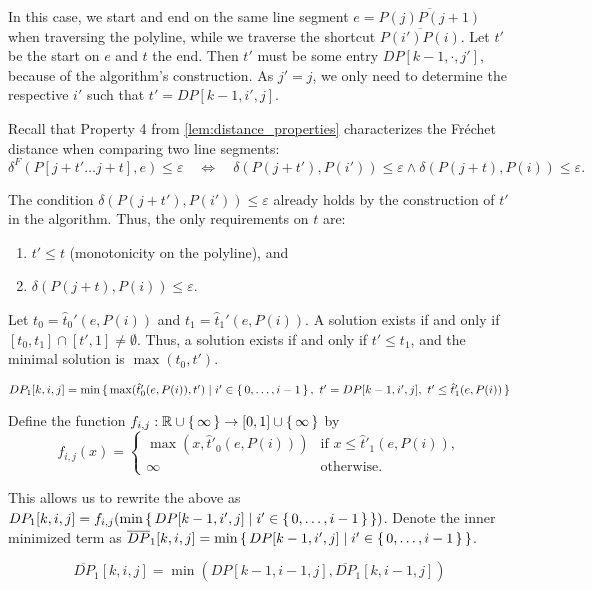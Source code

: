 In this case, we start and end on the same line segment \(e = \overline{P(j)P(j+1)}\) when traversing the polyline, while we traverse the shortcut \(\overline{P(i')P(i)}\). Let \(t'\) be the start on \(e\) and \(t\) the end. Then \(t'\) must be some entry \(DP[k-1, \cdot, j']\), because of the algorithm's construction. As \(j' = j\), we only need to determine the respective \(i'\) such that \(t' = DP[k-1, i', j]\).

Recall that Property 4 from \cref{lem:distance_properties} characterizes the Fréchet distance when comparing two line segments:
	\[\delta^F(P[j + t' \dots j + t], e) \leq \varepsilon \quad \iff \quad \delta(P(j+t'), P(i')) \leq \varepsilon \land \delta(P(j+t), P(i)) \leq \varepsilon.\]
	
The condition \(\delta(P(j+t'), P(i')) \leq \varepsilon\) already holds by the construction of \(t'\) in the algorithm. Thus, the only requirements on \(t\) are:
\begin{enumerate}
	\item \(t' \leq t\) (monotonicity on the polyline), and
	\item \(\delta(P(j + t), P(i)) \leq \varepsilon\).
\end{enumerate}

Let \(t_0 = \hat t_0'(e, P(i))\) and \(t_1 = \hat t_1'(e, P(i))\). A solution exists if and only if \([t_0, t_1] \cap [t', 1] \neq \emptyset\). Thus, a solution exists if and only if \(t' \leq t_1\), and the minimal solution is \(\max(t_0, t')\). 

\begin{observation}
	\(DP_1[k, i, j] = \min \set{ \max(\hat t'_0(e, P(i)), t') \mid i' \in \set{0, \dots, i - 1},\ t' = DP[k-1, i', j],\ t' \leq \hat t_1'(e, P(i)) }\)
\end{observation}

Define the function \(f_{i,j}: \mathbb{R} \cup \set{\infty} \to [0, 1] \cup \set{\infty}\) by
	\[f_{i,j}(x) =
	\begin{cases}
		\max(x, \hat t'_0(e, P(i))) &\textrm{if } x \leq \hat t'_1(e, P(i)), \\
		\infty &\textrm{otherwise}.
	\end{cases}\]

This allows us to rewrite the above as \(DP_1[k, i, j] = f_{i, j}(\min \set{DP[k-1, i', j] \mid i' \in \set{0, \dots, i - 1} })\). Denote the inner minimized term as \(\overline{DP}_1[k,i,j] = \min \set{DP[k-1, i', j] \mid i' \in \set{0, \dots, i - 1}}\).

\begin{observation}
	\[\overline{DP}_1[k,i,j] = \min (DP[k-1, i - 1, j], \overline{DP}_1[k, i - 1, j])\]
\end{observation}

